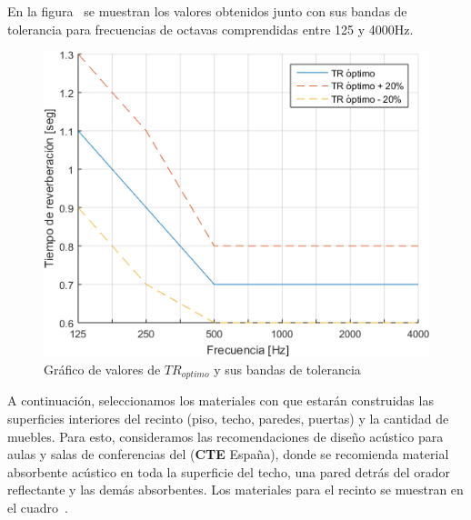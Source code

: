 \par En la figura~ se muestran los valores obtenidos junto con sus bandas de tolerancia para frecuencias de octavas comprendidas entre 125 y 4000Hz.


\begin{figure}[H]
	\centering
	\includegraphics[width=1\textwidth]{./img/TR_optimosYtolerancia.png}
	\caption{Gráfico de valores de $TR_{optimo}$ y sus bandas de tolerancia}
	\label{fig:TR_optimosYtolerancia}
\end{figure}

\par A continuación, seleccionamos los materiales con que estarán construidas las superficies interiores del recinto (piso, techo, paredes, puertas) y la cantidad de muebles. Para esto, consideramos las recomendaciones de diseño acústico para aulas y salas de conferencias del  (\textbf{CTE} España), donde se recomienda material absorbente acústico en toda la superficie del techo, una pared detrás del orador reflectante y las demás absorbentes. Los materiales para el recinto se muestran en el cuadro~.

